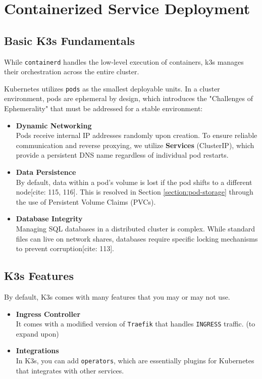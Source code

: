 
\chapter{Containerized Service Deployment}\label{chap:deployment}
\section{Basic K3s Fundamentals}
While \texttt{containerd} handles the low-level execution of containers, \gls{k3s} manages their orchestration across the entire cluster. 

Kubernetes utilizes \texttt{pods} as the smallest deployable units. In a cluster environment, pods are ephemeral by design, which introduces the "Challenges of Ephemerality" that must be addressed for a stable environment:

\begin{itemize}
	\item \textbf{Dynamic Networking} \\
	Pods receive internal IP addresses randomly upon creation. To ensure reliable communication and reverse proxying, we utilize \textbf{Services} (ClusterIP), which provide a persistent DNS name regardless of individual pod restarts.
	
	\item \textbf{Data Persistence} \\
	By default, data within a pod's volume is lost if the pod shifts to a different node[cite: 115, 116]. This is resolved in Section \ref{section:pod-storage} through the use of Persistent Volume Claims (PVCs).
	
	\item \textbf{Database Integrity} \\
	Managing SQL databases in a distributed cluster is complex. While standard files can live on network shares, databases require specific locking mechanisms to prevent corruption[cite: 113].
\end{itemize}


\section{K3s Features}
By default, K3s comes with many features that you may or may not use.

\begin{itemize}
	\item \textbf{Ingress Controller} \\
	It comes with a modified version of \texttt{Traefik} that handles \texttt{INGRESS} traffic. (to expand upon)
	
	\item \textbf{Integrations} \\
	In K3s, you can add \texttt{operators}, which are essentially plugins for Kubernetes that integrates with other services.
\end{itemize}


